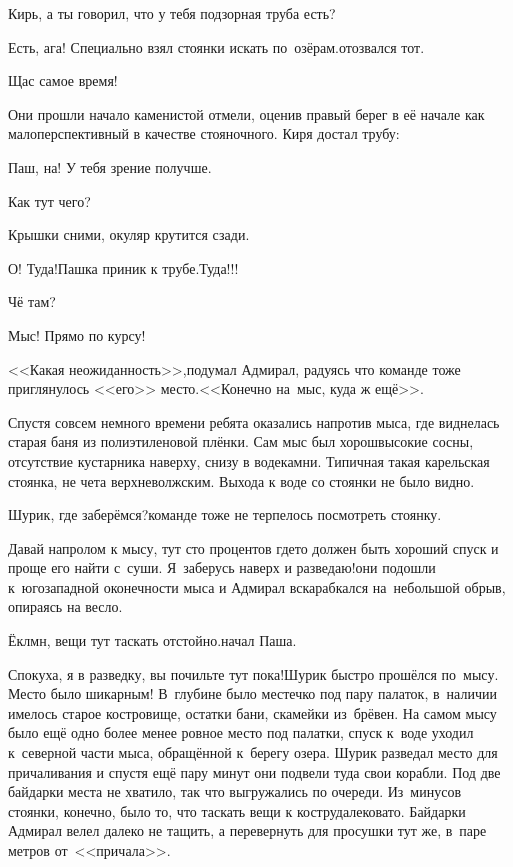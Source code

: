 \diagdash Кирь, а ты говорил, что у тебя подзорная труба есть?

\diagdash Есть, ага! Специально взял стоянки искать по~озёрам.\mdash отозвался тот.  

\diagdash Щас самое время!

Они прошли начало каменистой отмели, оценив правый берег в её начале как малоперспективный в качестве стояночного. Киря достал трубу:

\diagdash Паш, на! У тебя зрение получше.

\diagdash Как тут чего?

\diagdash Крышки сними, окуляр крутится сзади.

\diagdash О! Туда!\mdash Пашка приник к трубе.\mdash Туда!!!

\diagdash Чё там?

\diagdash Мыс! Прямо по курсу!

<<Какая неожиданность>>,\mdash подумал Адмирал, радуясь что команде тоже приглянулось <<его>> место.\mdash <<Конечно на~мыс, куда ж ещё>>.

Спустя совсем немного времени ребята оказались напротив мыса, где виднелась старая баня из полиэтиленовой плёнки. Сам мыс был хорош\mdash высокие сосны, отсутствие кустарника наверху, снизу в воде\mdash камни. Типичная такая карельская стоянка, не чета верхневолжским. Выхода к воде со стоянки не было видно. 

\diagdash Шурик, где заберёмся?\mdash команде тоже не терпелось посмотреть стоянку.

\diagdash Давай напролом к мысу, тут сто процентов где\sdash то должен быть хороший спуск и проще его найти с~суши. Я~заберусь наверх и разведаю!\mdash они подошли к~юго\sdash западной оконечности мыса и Адмирал вскарабкался на~небольшой обрыв, опираясь на весло.

\diagdash Ёклмн, вещи тут таскать отстойно.\mdash начал Паша. 

\diagdash Спокуха, я в разведку, вы почильте тут пока!\mdash Шурик быстро прошёлся по~мысу. Место было шикарным! В~глубине было местечко под пару палаток, в~наличии имелось старое костровище, остатки бани, скамейки из~брёвен. На самом мысу было ещё одно более менее ровное место под палатки, спуск к~воде уходил к~северной части мыса, обращённой к~берегу озера. Шурик разведал место для причаливания и спустя ещё пару минут они подвели туда свои корабли. Под две байдарки места не хватило, так что выгружались по очереди. Из~минусов стоянки, конечно, было то, что таскать вещи к костру\mdash далековато. Байдарки Адмирал велел далеко не тащить, а перевернуть для просушки тут же, в~паре метров от~<<причала>>.

